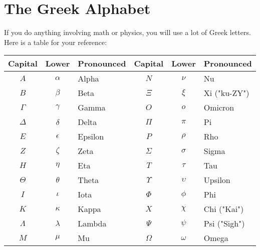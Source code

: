 \chapter{The Greek Alphabet}

If you do anything involving math or physics,  you will use a lot of Greek letters.   Here is a table for your reference:

\begin{tabular}{c c  l | c c l}
Capital & Lower & Pronounced & Capital & Lower & Pronounced\\
\hline
$A$ & $\alpha$ & Alpha & $N$ & $\nu$ & Nu\\
$B$ & $\beta$ & Beta & $\Xi$ & $\xi$ & Xi ("ku-ZY") \\
$\Gamma$ & $\gamma$ & Gamma & $O$ & $o$ & Omicron\\
$\Delta$ & $\delta$ & Delta & $\Pi$ & $\pi$ & Pi\\
$E$ & $\epsilon$ & Epsilon & $P$ & $\rho$ & Rho\\
$Z$ & $\zeta$ & Zeta & $\Sigma$ & $\sigma$ & Sigma\\
$H$ & $\eta$ & Eta & $T$ & $\tau$ & Tau\\
$\Theta$ & $\theta$ & Theta & $\Upsilon$ & $\upsilon$ & Upsilon\\
$I$ & $\iota$ & Iota & $\Phi$ & $\phi$ & Phi\\
$K$ & $\kappa$ & Kappa & $X$ & $\chi$ & Chi ("Kai")\\
$\Lambda$ & $\lambda$ & Lambda & $\Psi$ & $\psi$ & Psi ("Sigh")\\
$M$ & $\mu$ & Mu & $\Omega$ & $\omega$ & Omega
\end{tabular}